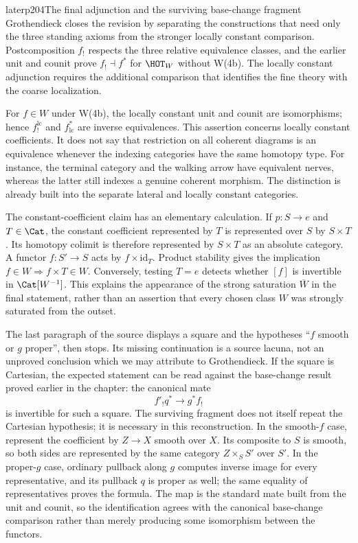 \begin{dcomment}{later}{p204}{The final adjunction and the surviving base-change fragment}
Grothendieck closes the revision by separating the constructions that need only the three standing axioms from the stronger locally constant comparison. Postcomposition $f_!$ respects the three relative equivalence classes, and the earlier unit and counit prove $f_!\dashv f^*$ for $\HOT_W$ without W(4b). The locally constant adjunction requires the additional comparison that identifies the fine theory with the coarse localization.

For $f\in W$ under W(4b), the locally constant unit and counit are isomorphisms; hence $f_!^{\mathrm{lc}}$ and $f^*_{\mathrm{lc}}$ are inverse equivalences. This assertion concerns locally constant coefficients. It does not say that restriction on all coherent diagrams is an equivalence whenever the indexing categories have the same homotopy type. For instance, the terminal category and the walking arrow have equivalent nerves, whereas the latter still indexes a genuine coherent morphism. The distinction is already built into the separate lateral and locally constant categories.

The constant-coefficient claim has an elementary calculation. If $p:S\to e$ and $T\in\Cat$, the constant coefficient represented by $T$ is represented over $S$ by $S\times T$. Its homotopy colimit is therefore represented by $S\times T$ as an absolute category. A functor $f:S'\to S$ acts by $f\times\mathrm{id}_T$. Product stability gives the implication $f\in W\Rightarrow f\times T\in W$. Conversely, testing $T=e$ detects whether $[f]$ is invertible in $\Cat[W^{-1}]$. This explains the appearance of the strong saturation $\overline W$ in the final statement, rather than an assertion that every chosen class $W$ was strongly saturated from the outset.

The last paragraph of the source displays a square and the hypotheses ``$f$ smooth or $g$ proper'', then stops. Its missing continuation is a source lacuna, not an unproved conclusion which we may attribute to Grothendieck. If the square is Cartesian, the expected statement can be read against the base-change result proved earlier in the chapter: the canonical mate
\[
 f'_!q^*\longrightarrow g^*f_!
\]
is invertible for such a square. The surviving fragment does not itself repeat the Cartesian hypothesis; it is necessary in this reconstruction. In the smooth-$f$ case, represent the coefficient by $Z\to X$ smooth over $X$. Its composite to $S$ is smooth, so both sides are represented by the same category $Z\times_S S'$ over $S'$. In the proper-$g$ case, ordinary pullback along $g$ computes inverse image for every representative, and its pullback $q$ is proper as well; the same equality of representatives proves the formula. The map is the standard mate built from the unit and counit, so the identification agrees with the canonical base-change comparison rather than merely producing some isomorphism between the functors.


\end{dcomment}
